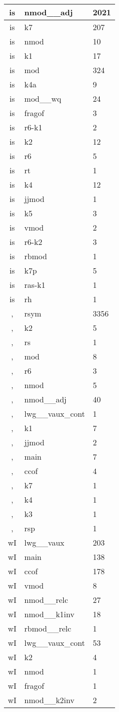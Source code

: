 \documentclass[a4 paper]{article}
\begin{document}
\begin{longtable}{cp{}p{}}
is & nmod\_\_adj & 2021\\ \midrule is & k7 & 207\\ \midrule is & nmod & 10\\ \midrule is & k1 & 17\\ \midrule is & mod & 324\\ \midrule is & k4a & 9\\ \midrule is & mod\_\_wq & 24\\ \midrule is & fragof & 3\\ \midrule is & r6-k1 & 2\\ \midrule is & k2 & 12\\ \midrule is & r6 & 5\\ \midrule is & rt & 1\\ \midrule is & k4 & 12\\ \midrule is & jjmod & 1\\ \midrule is & k5 & 3\\ \midrule is & vmod & 2\\ \midrule is & r6-k2 & 3\\ \midrule is & rbmod & 1\\ \midrule is & k7p & 5\\ \midrule is & ras-k1 & 1\\ \midrule is & rh & 1\\ \midrule 
, & rsym & 3356\\ \midrule , & k2 & 5\\ \midrule , & rs & 1\\ \midrule , & mod & 8\\ \midrule , & r6 & 3\\ \midrule , & nmod & 5\\ \midrule , & nmod\_\_adj & 40\\ \midrule , & lwg\_\_vaux\_cont & 1\\ \midrule , & k1 & 7\\ \midrule , & jjmod & 2\\ \midrule , & main & 7\\ \midrule , & ccof & 4\\ \midrule , & k7 & 1\\ \midrule , & k4 & 1\\ \midrule , & k3 & 1\\ \midrule , & rsp & 1\\ \midrule 
wI & lwg\_\_vaux & 203\\ \midrule wI & main & 138\\ \midrule wI & ccof & 178\\ \midrule wI & vmod & 8\\ \midrule wI & nmod\_\_relc & 27\\ \midrule wI & nmod\_\_k1inv & 18\\ \midrule wI & rbmod\_\_relc & 1\\ \midrule wI & lwg\_\_vaux\_cont & 53\\ \midrule wI & k2 & 4\\ \midrule wI & nmod & 1\\ \midrule wI & fragof & 1\\ \midrule wI & nmod\_\_k2inv & 2\\ \midrule 

\end{longtable}
\end{document}
